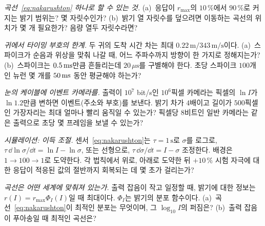 \begin{exercise}[\lvlB]
\label{ex:11:3}
\emph{곡선~\eqref{eq:nakarushton} 하나로 할 수 있는 것.} (a)~응답이 $r_{\max}$의 $10\,\%$에서 $90\,\%$로 커지는 밝기 범위는? 몇 자릿수인가? (b)~밝기 열 자릿수를 덮으려면 이동하는 곡선의 위치가 몇 개 필요한가? 음량 열두 자릿수라면?
\end{exercise}

\begin{exercise}[\lvlB]
\label{ex:11:4}
\emph{귀에서 타이밍 부호의 한계.} 두 귀의 도착 시간 차는 최대 $0.22\,\text{m}/343\,\text{m/s}$이다. (a)~스파이크가 순음과 위상을 맞춰 나갈 때, 어느 주파수까지 방향이 한 가지로 정해지는가? (b)~스파이크는 $0.5\,\text{ms}$만큼 흔들리는데 $20\,\mu\text{s}$를 구별해야 한다. 초당 스파이크 $100$개인 뉴런 몇 개를 $50\,\text{ms}$ 동안 평균해야 하는가?
\end{exercise}

\begin{exercise}[\lvlB]
\label{ex:11:5}
\emph{눈의 케이블에 이벤트 카메라를.} 출력이 $10^7$ bit/s인 $10^6$픽셀 카메라는 픽셀의 $\ln I$가 $\ln1.2$만큼 변하면 이벤트(주소와 부호)를 보낸다. 밝기 차가 $4$배이고 길이가 $500$픽셀인 가장자리는 최대 얼마나 빨리 움직일 수 있는가? 픽셀당 $8$비트인 일반 카메라는 같은 출력으로 초당 몇 프레임을 보낼 수 있는가?
\end{exercise}

\begin{exercise}[\lvlB]
\label{ex:11:6}
\emph{시뮬레이션: 이득 조절.} 센서~\eqref{eq:nakarushton}는 $\tau=1\,\text{s}$로 $\sigma$를 로그로, $\tau\,\dd\ln\sigma/\dd t=\ln I-\ln\sigma$, 또는 선형으로, $\tau\,\dd\sigma/\dd t=I-\sigma$ 조정한다. 배경은 $1\to100\to1$로 도약한다. 각 법칙에서 위로, 아래로 도약한 뒤 $+10\,\%$ 시험 자극에 대한 응답이 적응된 값의 절반까지 회복되는 데 몇 초가 걸리는가?
\end{exercise}

\begin{exercise}[\lvlC]
\label{ex:11:7}
\emph{곡선은 어떤 세계에 맞춰져 있는가.} 출력 잡음이 작고 일정할 때, 밝기에 대한 정보는 $r(I)=r_{\max}\Phi_I(I)$일 때 최대이다. $\Phi_I$는 밝기의 분포 함수이다. (a)~곡선~\eqref{eq:nakarushton}이 최적인 분포는 무엇이며, 그 $\log_{10}I$의 퍼짐은? (b)~출력 잡음이 푸아송일 때 최적인 곡선은?
\end{exercise}
